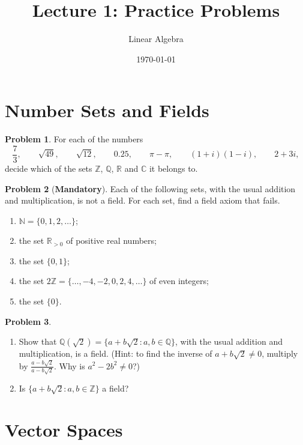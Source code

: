 \documentclass[11pt]{article}
\title{Lecture 1: Practice Problems}
\author{Linear Algebra}
\date{\today}
\theoremstyle{definition}
\newtheorem{problem}{Problem}[section]
\newcommand{\mandatory}{\textcolor{red!70!black}{\textbf{Mandatory}}}
\begin{document}
\maketitle

\section{Number Sets and Fields}

\begin{problem}\label{pr:numbers}
    For each of the numbers
    \[\frac{7}{3}, \qquad \sqrt{49}, \qquad \sqrt{12}, \qquad 0.25, \qquad \pi - \pi, \qquad (1 + i)(1 - i), \qquad 2 + 3i,\]
    decide which of the sets $\mathbb{Z}$, $\mathbb{Q}$, $\mathbb{R}$ and $\mathbb{C}$ it belongs to.
\end{problem}

\begin{problem}[\mandatory]\label{pr:field-fail}
    Each of the following sets, with the usual addition and multiplication, is not a field. For each set, find a field axiom that fails.
    \begin{enumerate}[label=(\alph*)]
        \item $\mathbb{N} = \{0, 1, 2, \ldots\}$;
        \item the set $\mathbb{R}_{>0}$ of positive real numbers;
        \item the set $\{0, 1\}$;
        \item the set $2\mathbb{Z} = \{\ldots, -4, -2, 0, 2, 4, \ldots\}$ of even integers;
        \item the set $\{0\}$.
    \end{enumerate}
\end{problem}

\begin{problem}\label{pr:Qsqrt2}
    \begin{enumerate}[label=(\alph*)]
        \item Show that $\mathbb{Q}(\sqrt{2}) = \{a + b\sqrt{2} : a, b \in \mathbb{Q}\}$, with the usual addition and multiplication, is a field. (Hint: to find the inverse of $a + b\sqrt{2} \neq 0$, multiply by $\frac{a - b\sqrt{2}}{a - b\sqrt{2}}$. Why is $a^2 - 2b^2 \neq 0$?)
        \item Is $\{a + b\sqrt{2} : a, b \in \mathbb{Z}\}$ a field?
    \end{enumerate}
\end{problem}

\section{Vector Spaces}
\end{document}
